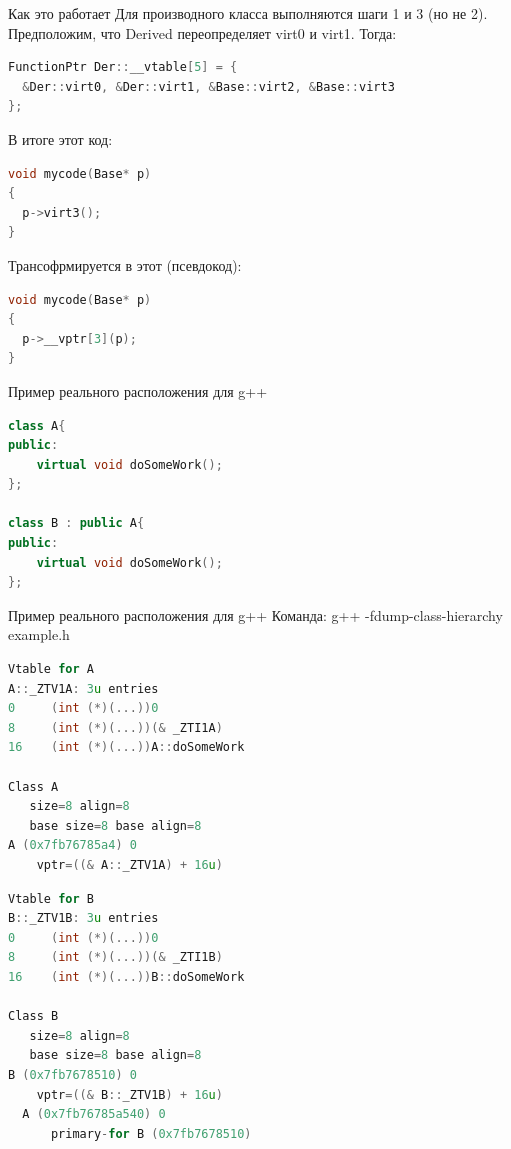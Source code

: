 \documentclass[10pt]{beamer}
\begin{document}
\begin{frame}[fragile]{Как это работает}
Для производного класса выполняются шаги 1 и 3 (но не 2). Предположим, что Derived переопределяет virt0 и virt1. Тогда:
\begin{lstlisting}[language=C++]
FunctionPtr Der::__vtable[5] = {
  &Der::virt0, &Der::virt1, &Base::virt2, &Base::virt3
};
\end{lstlisting}
В итоге этот код:
\begin{lstlisting}[language=C++]
void mycode(Base* p)
{
  p->virt3();
}
\end{lstlisting}
Трансофрмируется в этот (псевдокод):
\begin{lstlisting}[language=C++]
void mycode(Base* p)
{
  p->__vptr[3](p);
}
\end{lstlisting}
\end{frame}

\begin{frame}[fragile]{Пример реального расположения для g++}
\begin{lstlisting}[language=C++]
class A{
public:
    virtual void doSomeWork();
};

class B : public A{
public:
    virtual void doSomeWork();
};
\end{lstlisting}
\end{frame}

\begin{frame}[fragile]{Пример реального расположения для g++}
Команда: g++ -fdump-class-hierarchy example.h
\begin{multicols}{2}
\begin{lstlisting}[language=C++]
Vtable for A
A::_ZTV1A: 3u entries
0     (int (*)(...))0
8     (int (*)(...))(& _ZTI1A)
16    (int (*)(...))A::doSomeWork

Class A
   size=8 align=8
   base size=8 base align=8
A (0x7fb76785a4) 0
    vptr=((& A::_ZTV1A) + 16u)
\end{lstlisting}
\vfill\eject
\begin{lstlisting}[language=C++]
Vtable for B
B::_ZTV1B: 3u entries
0     (int (*)(...))0
8     (int (*)(...))(& _ZTI1B)
16    (int (*)(...))B::doSomeWork

Class B
   size=8 align=8
   base size=8 base align=8
B (0x7fb7678510) 0
    vptr=((& B::_ZTV1B) + 16u)
  A (0x7fb76785a540) 0
      primary-for B (0x7fb7678510)
\end{lstlisting}
\end{multicols}
\end{frame}
\end{document}
